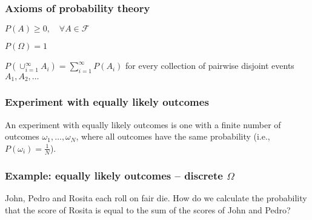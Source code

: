 \begin{frame}
\frametitle{Axioms of probability theory}


    \begin{probAxiom}

        $P(A)\ge 0,\quad\forall A\in\mathcal{F}$

    \end{probAxiom}

    \begin{probAxiom}

        $P(\Omega)=1$

    \end{probAxiom}

    \begin{probAxiom}

        $P\left(\cup_{i=1}^\infty A_i\right)=\sum_{i=1}^\infty P(A_i)$ for every collection of pairwise disjoint events $A_1,A_2,\ldots$

    \end{probAxiom}



\end{frame}

\begin{frame}
    \frametitle{Experiment with equally likely outcomes}

    An experiment with equally likely outcomes is one with a finite number of
    outcomes $\omega_1,\ldots,\omega_N$, where all outcomes have the same
    probability (i.e., $P(\omega_i)=\frac{1}{N}$).


\end{frame}

\begin{frame}
    \frametitle{Example: equally likely outcomes -- discrete $\Omega$}

    \begin{probExample}
        John, Pedro and Rosita each roll on fair die. How do we calculate the
        probability that the score of Rosita is equal to the sum of the scores
        of John and Pedro?
    \end{probExample}


\end{frame}


